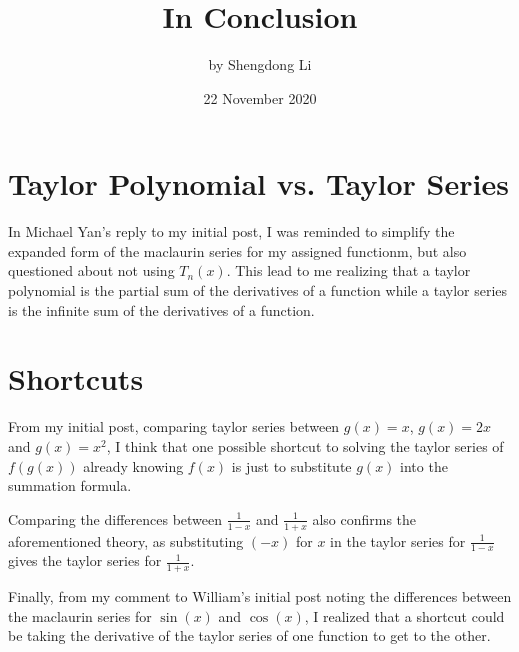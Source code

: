 \documentclass[12pt]{article}
\begin{document}
\title{In Conclusion}
\author{by Shengdong Li}
\date{22 November 2020}
\maketitle

\section{Taylor Polynomial vs. Taylor Series}
In Michael Yan's reply to my initial post, I was reminded to simplify the expanded form of the maclaurin series for my assigned functionm, but also questioned about not using $T_{n}(x)$. This lead to me realizing that a taylor polynomial is the partial sum of the derivatives of a function while a taylor series is the infinite sum of the derivatives of a function.

\section{Shortcuts}
From my initial post, comparing taylor series between $g(x)=x$, $g(x)=2x$ and $g(x)=x^2$, I think that one possible shortcut to solving the taylor series of $f(g(x))$ already knowing $f(x)$ is just to substitute $g(x)$ into the summation formula.

Comparing the differences between $\frac{1}{1-x}$ and $\frac{1}{1+x}$ also confirms the aforementioned theory, as substituting $(-x)$ for $x$ in the taylor series for $\frac{1}{1-x}$ gives the taylor series for $\frac{1}{1+x}$.

Finally, from my comment to William's initial post noting the differences between the maclaurin series for $\sin(x)$ and $\cos(x)$, I realized that a shortcut could be taking the derivative of the taylor series of one function to get to the other.
\end{document}
